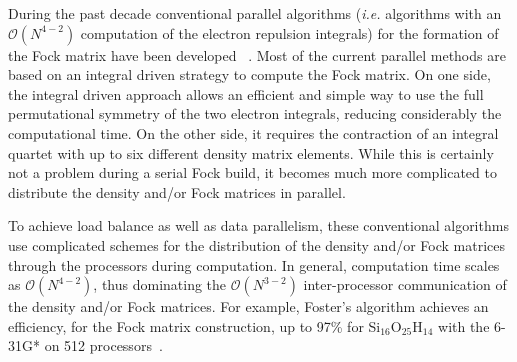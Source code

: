 \documentclass[prl,preprint,doublespace]{revtex4} %
\begin{document}
 During the past decade conventional parallel algorithms 
 ({\em i.e.} algorithms with an $\mathcal{O}(N^{4-2})$ computation 
 of the electron repulsion integrals) for the 
 formation of the Fock matrix have been developed
 ~\cite{MColvin93,TFurlani95,IFoster96,RHarrison96,YAlexeev02,HTakashima02,RLindh03}.
 Most of the current parallel methods are based on an integral driven strategy
 to compute the Fock matrix. On one side, the integral driven approach
 allows an efficient and simple way to use the full permutational symmetry
 of the two electron integrals, reducing considerably the computational time. 
 On the other side, it requires the contraction of an integral quartet with up to six 
 different density matrix elements.
 While this is certainly not a problem during a serial Fock build, it becomes
 much more complicated to distribute the density and/or Fock matrices in parallel.

 To achieve load balance as well as data parallelism, 
 these conventional algorithms use complicated schemes for the 
 distribution of the density and/or Fock 
 matrices through the processors during computation.
 In general, computation time scales as $\mathcal{O}(N^{4-2})$, thus dominating
 the $\mathcal{O}(N^{3-2})$ inter-processor 
 communication of the density and/or Fock matrices.
 For example, Foster's algorithm achieves an efficiency, for the 
 Fock matrix construction, up to 97\% for Si$_{16}$O$_{25}$H$_{14}$ with 
 the 6-31G* on 512 processors~\cite{RHarrison96}.





\end{document}
